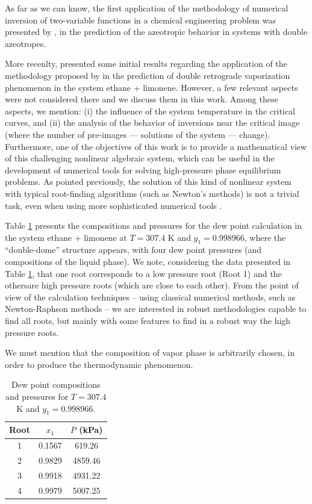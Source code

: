 \documentclass{article}
\theoremstyle{definition}
\theoremstyle{remark}
\begin{document}
As far as we can know, the first application of the methodology  of numerical inversion of two-variable functions in a chemical engineering problem was presented by \cite{canadian}, in the prediction of the azeotropic behavior in systems with double azeotropes.

More recenlty, \cite{ireme} presented some initial results regarding the application of the methodology proposed by \cite{malta} in the prediction of double retrograde vaporization phenomenon in the system ethane + limonene. However, a few relevant aspects were not considered there and we discuss them in this work. Among these aspects, we mention: (i) the influence of the system temperature in the critical curves, and (ii) the analysis of the behavior of inversions near the critical image (where the number of pre-images --- solutions of the system --- change). Furthermore, one of the objectives of this work is to provide a mathematical view of this challenging nonlinear algebraic system, which can be useful in the development of numerical tools for solving high-pressure phase equilibrium problems. As pointed previously, the solution of this kind of nonlinear system with typical root-finding algorithms (such as Newton's methods) is not a trivial task, even when using more sophisticated numerical tools \cite{jnsa}.

Table \ref{tab:roots_double_dome} presents the compositions and pressures for the dew point calculation in the system ethane + limonene at $T = 307.4$ K and $y_1 = 0.998966$, where the ``double-dome'' structure appears, with four dew point pressures (and compositions of the liquid phase). We note, considering the data presented in Table \ref{tab:roots_double_dome}, that one root corresponds to a low pressure root (Root 1) and the othersare high pressure roots (which are close to each other). From the point of view of the calculation techniques -- using classical numerical methods, such as Newton-Raphson methods -- we are interested in robust methodologies capable to find all roots, but mainly with some features to find in a robust way the high pressure roots.

We must mention that the composition of vapor phase is arbitrarily chosen, in order to produce the thermodynamic phenomenon.

\begin{table}[http!]
	\begin{center}
	\begin{tabular}{ccc} \hline \small
Root & $x_1$ & $P$ (kPa) \\
\hline
1 & 0.1567 & 619.26 \\
2 & 0.9829 & 4859.46 \\
3 & 0.9918 & 4931.22 \\
4 & 0.9979 & 5007.25 \\
	\hline
	\end{tabular}
	\caption{ {\small Dew point compositions and pressures for $T = 307.4$ K and $y_1 = 0.998966$.}}\label{tab:roots_double_dome}
	\end{center}
\end{table}
\end{document}
